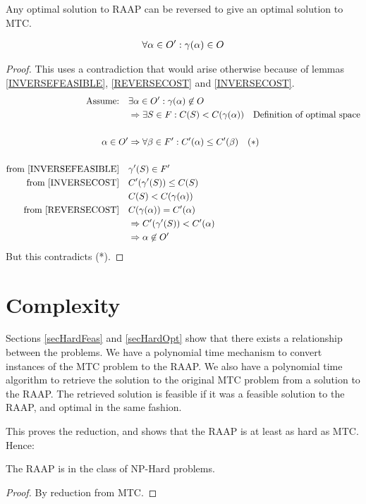 \begin{lemma}
\label{REVERSEOPTIMAL}
Any optimal solution to RAAP can be reversed to give an optimal solution to MTC.

\begin{align}
	\nonumber \forall \alpha \in O' : \gamma(\alpha) \in O
\end{align}
\end{lemma}
\begin{proof}
This uses a contradiction that would arise otherwise because of lemmas \ref{INVERSEFEASIBLE}, \ref{REVERSECOST} and \ref{INVERSECOST}.
\begin{align}
	\nonumber \mbox{Assume:} \quad & \exists \alpha \in O' : \gamma(\alpha) \not\in O \\
	\nonumber & \Rightarrow \exists S \in F : C(S) < C(\gamma(\alpha)) \quad \mbox{Definition of optimal space} \\
	\nonumber \\
	\nonumber \alpha \in O' & \Rightarrow \forall \beta \in F' : C'(\alpha) \leq C'(\beta) \quad (*)\\
	\nonumber \\
	\nonumber \mbox{from \ref{INVERSEFEASIBLE}}\quad & \gamma'(S) \in F' \\
	\nonumber \mbox{from \ref{INVERSECOST}}\quad & C'(\gamma'(S)) \leq C(S) \\
	\nonumber & C(S) < C(\gamma(\alpha)) \\
	\nonumber \mbox{from \ref{REVERSECOST}}\quad & C(\gamma(\alpha)) = C'(\alpha)\\
	\nonumber & \Rightarrow C'(\gamma'(S)) < C'(\alpha) \\
	\nonumber & \Rightarrow \alpha \not\in O'
\end{align}
But this contradicts (*).

\end{proof}

\section{Complexity}

Sections \ref{secHardFeas} and \ref{secHardOpt} show that there exists a relationship between the problems.
We have a polynomial time mechanism to convert instances of the MTC problem to the RAAP.
We also have a polynomial time algorithm to retrieve the solution to the original MTC problem from a solution to the RAAP.
The retrieved solution is feasible if it was a feasible solution to the RAAP, and optimal in the same fashion.

This proves the reduction, and shows that the RAAP is at least as hard as MTC.
Hence:
\begin{theorem}
The RAAP is in the class of NP-Hard problems.
\end{theorem}
\begin{proof}
By reduction from MTC.
\end{proof}